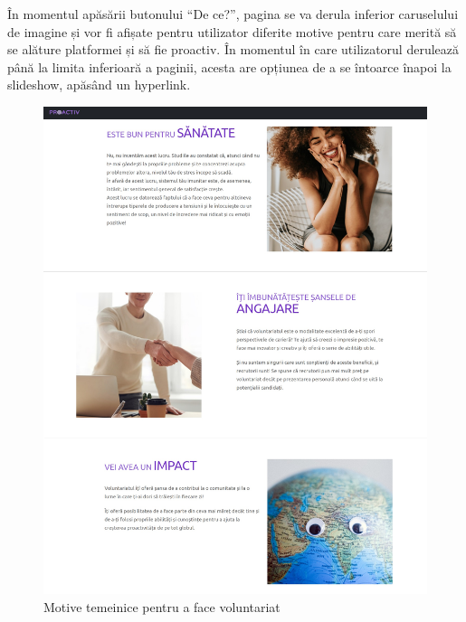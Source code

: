 \documentclass[12pt,a4paper]{report}
\begin{document}
\begin{itemize}
În momentul apăsării butonului “De ce?”, pagina se va derula inferior caruselului de imagine și vor fi afișate pentru utilizator diferite motive pentru care merită să se alăture platformei și să fie proactiv. În momentul în care utilizatorul derulează până la limita inferioară a paginii, acesta are opțiunea de a se întoarce înapoi la slideshow, apăsând un hyperlink.
\\
\begin{figure}[H]
\centering
  \includegraphics[width=1\linewidth]{./imagini/pp4.jpg}
  \caption{Motive temeinice pentru a face voluntariat}
\end{figure}
\end{itemize}

\newpage
\end{document}
